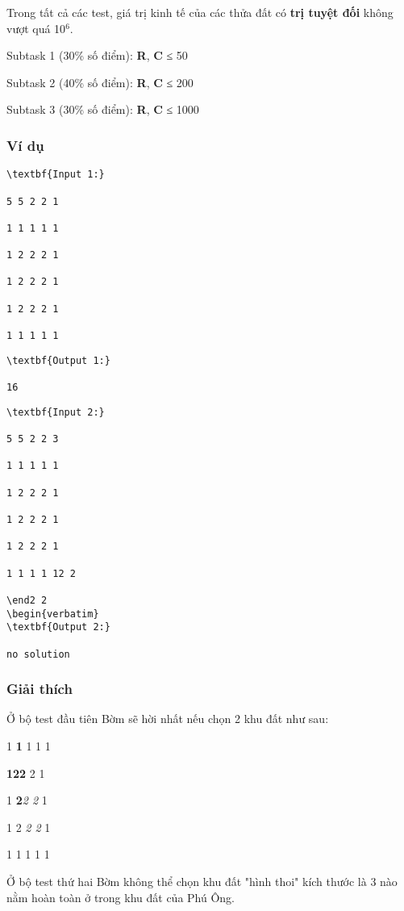 Trong tất cả các test, giá trị kinh tế của các thửa đất có \textbf{trị tuyệt đối} không vượt quá 10$^6$.

Subtask 1 (30\% số điểm): \textbf{R}, \textbf{C} ≤ 50

Subtask 2 (40\% số điểm): \textbf{R}, \textbf{C} ≤ 200

Subtask 3 (30\% số điểm): \textbf{R}, \textbf{C} ≤ 1000

\subsubsection{Ví dụ}
\begin{verbatim}
\textbf{Input 1:}

5 5 2 2 1

1 1 1 1 1

1 2 2 2 1

1 2 2 2 1

1 2 2 2 1

1 1 1 1 1

\end{verbatim}
\begin{verbatim}
\textbf{Output 1:}

16

\end{verbatim}
\begin{verbatim}
\textbf{Input 2:}

5 5 2 2 3

1 1 1 1 1

1 2 2 2 1

1 2 2 2 1

1 2 2 2 1

1 1 1 1 12 2

\end2 2
\begin{verbatim}
\textbf{Output 2:}

no solution

\end{verbatim}

\subsubsection{Giải thích}

Ở bộ test đầu tiên Bờm sẽ hời nhất nếu chọn 2 khu đất như sau:

1 \textbf{1} 1 1 1

\textbf{1}\textbf{2}\textbf{2} 2 1

1 \textbf{2}\emph{2 2} 1

1 2 \emph{2 2} 1

1 1 1 1 1

Ở bộ test thứ hai Bờm không thể chọn khu đất "hình thoi" kích thước là 3 nào nằm hoàn toàn ở trong khu đất của Phú Ông.
